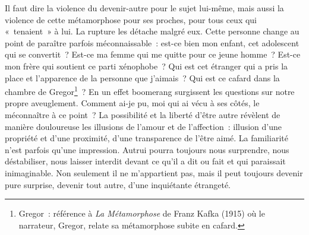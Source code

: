 {Il faut dire la violence du devenir-autre pour le sujet lui-même, mais aussi la violence de cette métamorphose pour ses proches, pour tous ceux qui «~tenaient~» à lui. La rupture les détache malgré eux. Cette personne change au point de paraître parfois méconnaissable~: est-ce bien mon enfant, cet adolescent qui se convertit~? Est-ce ma femme qui me quitte pour ce jeune homme~? Est-ce mon frère qui soutient ce parti xénophobe~? Qui est cet étranger qui a pris la place et l'apparence de la personne que j'aimais~? Qui est ce cafard dans la chambre de Gregor\footnote{Gregor~: référence à \emph{La Métamorphose} de Franz Kafka (1915) où le narrateur, Gregor, relate sa métamorphose subite en cafard.}~? En un effet boomerang surgissent les questions sur notre propre aveuglement. Comment ai-je pu, moi qui ai vécu à ses côtés, le méconnaître à ce point~? La possibilité et la liberté d'être autre révèlent de manière douloureuse les illusions de l'amour et de l'affection~: illusion d'une propriété et d'une proximité, d'une transparence de l'être aimé. La familiarité n'est parfois qu'une impression. Autrui pourra toujours nous surprendre, nous déstabiliser, nous laisser interdit devant ce qu'il a dit ou fait et qui paraissait inimaginable. Non seulement il ne m'appartient pas, mais il peut toujours devenir pure surprise, devenir tout autre, d'une inquiétante étrangeté.
}



